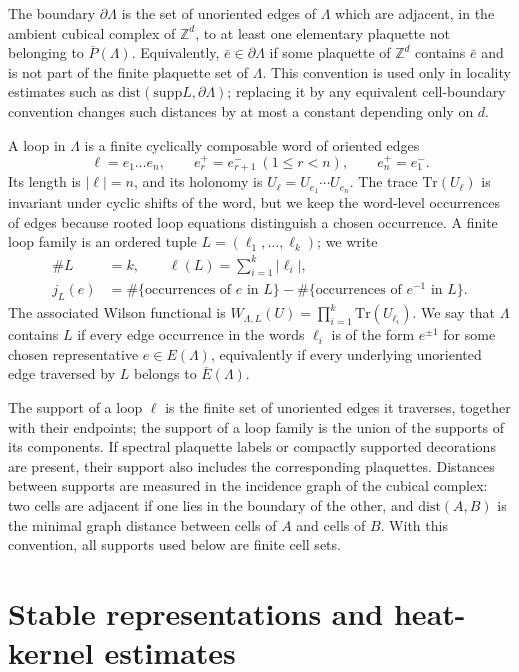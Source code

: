 \documentclass[11pt,a4paper,reqno]{amsart}
\theoremstyle{definition}
\theoremstyle{remark}
\newcommand\Z{{\mathbb{Z}}}
\newcommand\Tr{{\mathrm{Tr}}}
\newcommand\supp{{\mathrm{supp}}}
\newcommand\dist{{\mathrm{dist}}}
\begin{document}
The boundary $\partial\Lambda$ is the set of unoriented edges of $\Lambda$ which are adjacent, in the ambient cubical complex of $\Z^d$, to at least one elementary plaquette not belonging to $\overline P(\Lambda)$.  Equivalently, $\bar e\in\partial\Lambda$ if some plaquette of $\Z^d$ contains $\bar e$ and is not part of the finite plaquette set of $\Lambda$.  This convention is used only in locality estimates such as $\dist(\supp L,\partial\Lambda)$; replacing it by any equivalent cell-boundary convention changes such distances by at most a constant depending only on $d$.

A loop in $\Lambda$ is a finite cyclically composable word of oriented edges
\[
\ell=e_1\ldots e_n,\qquad e_r^+=e_{r+1}^-\ (1\le r<n),\qquad e_n^+=e_1^- .
\]
Its length is $|\ell|=n$, and its holonomy is $U_\ell=U_{e_1}\cdots U_{e_n}.$ The trace $\Tr(U_\ell)$ is invariant under cyclic shifts of the word, but we keep the word-level occurrences of edges because rooted loop equations distinguish a chosen occurrence.  A finite loop family is an ordered tuple $L=(\ell_1,\ldots,\ell_k)$; we write
\[
\begin{aligned}
\#L&=k,\qquad \ell(L)=\sum_{i=1}^k|\ell_i|,\\
j_L(e)&=\#\{\text{occurrences of }e\text{ in }L\}
-\#\{\text{occurrences of }e^{-1}\text{ in }L\}.
\end{aligned}
\]
The associated Wilson functional is $W_{\Lambda,L}(U)=\prod_{i=1}^k \Tr(U_{\ell_i}).$ We say that $\Lambda$ contains $L$ if every edge occurrence in the words $\ell_i$ is of the form $e^{\pm1}$ for some chosen representative $e\in E(\Lambda)$, equivalently if every underlying unoriented edge traversed by $L$ belongs to $\overline E(\Lambda)$.

The support of a loop $\ell$ is the finite set of unoriented edges it traverses, together with their endpoints; the support of a loop family is the union of the supports of its components.  If spectral plaquette labels or compactly supported decorations are present, their support also includes the corresponding plaquettes.  Distances between supports are measured in the incidence graph of the cubical complex: two cells are adjacent if one lies in the boundary of the other, and $\dist(A,B)$ is the minimal graph distance between cells of $A$ and cells of $B$.  With this convention, all supports used below are finite cell sets.


\section{Stable representations and heat-kernel estimates}
\label{sec:heat-kernel-estimates}
\end{document}
